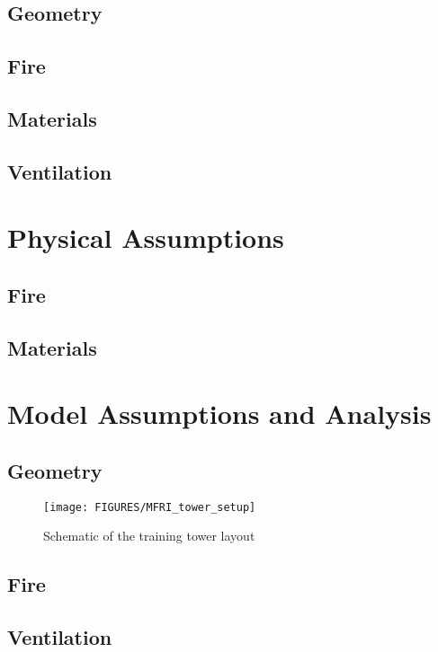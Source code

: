 \documentclass[11pt]{book}
\begin{document}
\subsection{Geometry}

\subsection{Fire}

\subsection{Materials}

\subsection{Ventilation}

\section{Physical Assumptions}
\subsection{Fire}

\subsection{Materials}

\section{Model Assumptions and Analysis}
\subsection{Geometry}
\begin{figure}[\figoptions]
\begin{center}
\texttt{[image: FIGURES/MFRI\_tower\_setup]}
\end{center}
\caption {Schematic of the training tower layout}
\label{figtowerplan}%
\end{figure}

\subsection{Fire}

\subsection{Ventilation}
\end{document}
